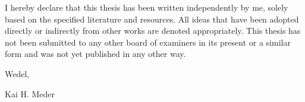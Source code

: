 \label{cha:aff}
I hereby declare that this thesis has been written independently by me, solely based on the specified literature and resources. All ideas that have been adopted directly or indirectly from other works are denoted appropriately. This thesis has not been submitted to any other board of examiners in its present or a similar form and was not yet published in any other way.

\bigskip

Wedel, \Datum

\vspace{5ex}

\begin{center}
Kai H. Meder
\end{center}